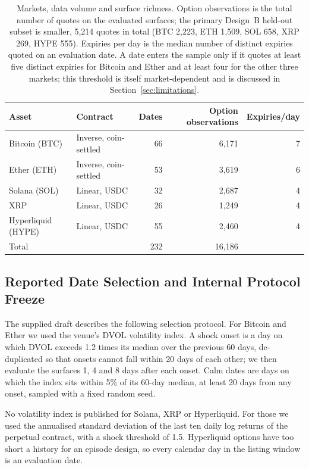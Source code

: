 \documentclass[runningheads]{llncs}
\begin{document}
\begin{table}[htbp]
\caption{Markets, data volume and surface richness. Option observations is
the total number of quotes on the evaluated surfaces; the primary Design~B
held-out subset is smaller, 5,214 quotes in total (BTC 2,223, ETH 1,509,
SOL 658, XRP 269, HYPE 555). Expiries per day is the median number of distinct
expiries quoted on an evaluation date. A date enters the sample only if it
quotes at least five distinct expiries for Bitcoin and Ether and at least four
for the other three markets; this threshold is itself market-dependent and is
discussed in Section~\ref{sec:limitations}.}
\label{tab:markets}
\centering
\begin{tabular}{llrrr}
\toprule
Asset & Contract & Dates & Option observations & Expiries/day \\
\midrule
Bitcoin (BTC)      & Inverse, coin-settled &  66 &  6,171 & 7 \\
Ether (ETH)        & Inverse, coin-settled &  53 &  3,619 & 6 \\
Solana (SOL)       & Linear, USDC          &  32 &  2,687 & 4 \\
XRP                & Linear, USDC          &  26 &  1,249 & 4 \\
Hyperliquid (HYPE) & Linear, USDC          &  55 &  2,460 & 4 \\
\midrule
Total              &                       & 232 & 16,186 &   \\
\bottomrule
\end{tabular}
\end{table}

\subsection{Reported Date Selection and Internal Protocol Freeze}
\label{sec:selection}

The supplied draft describes the following selection protocol. For
Bitcoin and Ether we used the venue's DVOL volatility index. A shock
onset is a day on which DVOL exceeds 1.2 times its median over the
previous 60 days, de-duplicated so that onsets cannot fall within 20
days of each other; we then evaluate the surfaces 1, 4 and 8 days after
each onset. Calm dates are days on which the index sits within 5\% of
its 60-day median, at least 20 days from any onset, sampled with a fixed
random seed.

No volatility index is published for Solana, XRP or Hyperliquid. For
those we used the annualised standard deviation of the last ten daily
log returns of the perpetual contract, with a shock threshold of 1.5.
Hyperliquid options have too short a history for an episode design, so
every calendar day in the listing window is an evaluation date.
\end{document}
